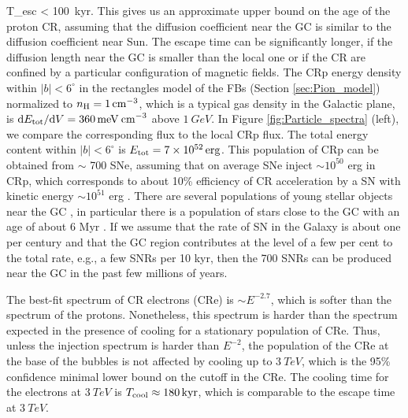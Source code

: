 \be
T_{\rm esc} <  \approx \SI{100}{kyr}.
\ee
This gives us an approximate upper bound on the age of the proton CR, 
assuming that the diffusion coefficient near the GC is similar to the diffusion coefficient near Sun.
The escape time can be significantly longer, if the diffusion length near the GC is smaller than the local one
or if the CR are confined by a particular configuration of magnetic fields.
The CRp energy density within $|b| < 6^\circ$ in the rectangles model of the FBs (Section \ref{sec:Pion_model})  
normalized to $n_{\text{H}} = \SI{1}{cm^{-3}}$, which is a typical gas density in the Galactic plane,
is $\text{d} E_{\text{tot}} / \text{d} V = \SI{360}{meV\: cm^{-3}}$ above $\SI{1}{GeV}$.
In Figure \ref{fig:Particle_spectra} (left), we compare the corresponding flux to the local CRp flux.
The total energy content within $|b| < 6^\circ$ is $E_{\text{tot}} = \SI{7e52}{erg}$.
This population of CRp can be obtained from $\sim$ 700 SNe, 
assuming that on average SNe inject $\sim 10^{50}$ erg in CRp, which corresponds to about 10\% efficiency
of CR acceleration by a SN with kinetic energy $\sim 10^{51}$ erg \citep[e.g.,][]{Spurio2015}.
There are several populations of young stellar objects near the GC \citep{2009ApJ...702..178Y, 2012A&A...537A.121I},
in particular there is a population of stars close to the GC with an age of about 6 Myr \citep{2006ApJ...643.1011P}.
If we assume that the rate of SN in the Galaxy is about one per century and that the GC region contributes at the level of
a few per cent to the total rate, e.g., a few SNRs per 10 kyr, then the 700 SNRs can be produced near the GC
in the past few millions of years.


The best-fit spectrum of CR electrons (CRe) is $\sim E^{-2.7}$, which is softer than the spectrum of the protons.
Nonetheless, this spectrum is harder than the spectrum expected in the presence of cooling
for a stationary population of CRe.
Thus, unless the injection spectrum is harder than $E^{-2}$, the population of the CRe at the base of the 
bubbles is not affected by cooling up to $\SI{3}{TeV}$,
which is the 95\% confidence minimal lower bound on the cutoff in the CRe. 
The cooling time for the electrons at %
$\SI{3}{TeV}$ is $T_{\rm cool} \approx \SI{180}{kyr}$,
which is comparable to the escape time at $\SI{3}{TeV}$.


